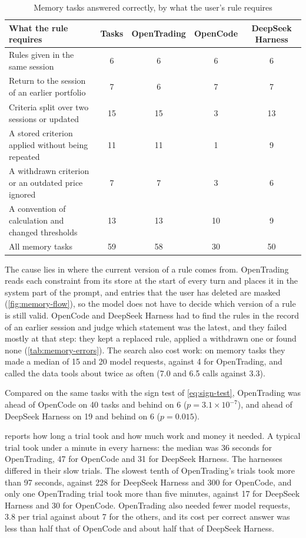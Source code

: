 \begin{table}[H]
  \centering
  \caption{Memory tasks answered correctly, by what the user's rule requires}\label{tab:memory-kinds-results}
  \begin{tabularx}{\textwidth}{@{}L *{4}{S[table-format=2.0]}@{}}
    \toprule
    {What the rule requires} & {Tasks} & {OpenTrading} & {OpenCode} & {DeepSeek Harness}\\
    \midrule
    Rules given in the same session & 6 & 6 & 6 & 6\\
    Return to the session of an earlier portfolio & 7 & 6 & 7 & 7\\
    Criteria split over two sessions or updated & 15 & 15 & 3 & 13\\
    A stored criterion applied without being repeated & 11 & 11 & 1 & 9\\
    A withdrawn criterion or an outdated price ignored & 7 & 7 & 3 & 6\\
    A convention of calculation and changed thresholds & 13 & 13 & 10 & 9\\
    \midrule
    All memory tasks & 59 & 58 & 30 & 50\\
    \bottomrule
  \end{tabularx}
\end{table}

The cause lies in where the current version of a rule comes from.
OpenTrading reads each constraint from its store at the start of every turn and places it in the system part of the prompt, and entries that the user has deleted are masked (\cref{fig:memory-flow}), so the model does not have to decide which version of a rule is still valid.
OpenCode and DeepSeek Harness had to find the rules in the record of an earlier session and judge which statement was the latest, and they failed mostly at that step: they kept a replaced rule, applied a withdrawn one or found none (\cref{tab:memory-errors}).
The search also cost work: on memory tasks they made a median of 15 and 20 model requests, against 4 for OpenTrading, and called the data tools about twice as often (7.0 and 6.5 calls against 3.3).

Compared on the same tasks with the sign test of \cref{eq:sign-test}, OpenTrading was ahead of OpenCode on 40 tasks and behind on 6 ($p=3.1\times10^{-7}$), and ahead of DeepSeek Harness on 19 and behind on 6 ($p=0.015$).

\label{sec:speed-cost}
 reports how long a trial took and how much work and money it needed.
A typical trial took under a minute in every harness: the median was 36 seconds for OpenTrading, 47 for OpenCode and 31 for DeepSeek Harness.
The harnesses differed in their slow trials.
The slowest tenth of OpenTrading's trials took more than 97 seconds, against 228 for DeepSeek Harness and 300 for OpenCode, and only one OpenTrading trial took more than five minutes, against 17 for DeepSeek Harness and 30 for OpenCode.
OpenTrading also needed fewer model requests, 3.8 per trial against about 7 for the others, and its cost per correct answer was less than half that of OpenCode and about half that of DeepSeek Harness.

